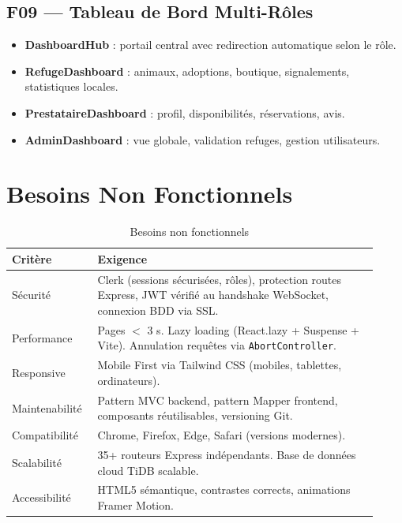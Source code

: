 \documentclass[12pt,a4paper]{report}
\begin{document}
\subsection{F09 --- Tableau de Bord Multi-Rôles}
\begin{itemize}[leftmargin=2em,itemsep=2pt]
  \item \textbf{DashboardHub} : portail central avec redirection automatique selon le rôle.
  \item \textbf{RefugeDashboard} : animaux, adoptions, boutique, signalements, statistiques locales.
  \item \textbf{PrestataireDashboard} : profil, disponibilités, réservations, avis.
  \item \textbf{AdminDashboard} : vue globale, validation refuges, gestion utilisateurs.
\end{itemize}

\section{Besoins Non Fonctionnels}

\begin{table}[H]
\centering
\begin{tabular}{@{}L{0.20\linewidth}L{0.72\linewidth}@{}}
\toprule
\textbf{Critère} & \textbf{Exigence} \\
\midrule
Sécurité & Clerk (sessions sécurisées, rôles), protection routes Express, JWT vérifié au handshake WebSocket, connexion BDD via SSL. \\[4pt]
Performance & Pages $<$ 3 s. Lazy loading (React.lazy + Suspense + Vite). Annulation requêtes via \texttt{AbortController}. \\[4pt]
Responsive & Mobile First via Tailwind CSS (mobiles, tablettes, ordinateurs). \\[4pt]
Maintenabilité & Pattern MVC backend, pattern Mapper frontend, composants réutilisables, versioning Git. \\[4pt]
Compatibilité & Chrome, Firefox, Edge, Safari (versions modernes). \\[4pt]
Scalabilité & 35+ routeurs Express indépendants. Base de données cloud TiDB scalable. \\[4pt]
Accessibilité & HTML5 sémantique, contrastes corrects, animations Framer Motion. \\
\bottomrule
\end{tabular}
\caption{Besoins non fonctionnels}
\label{tab:bnf}
\end{table}
\end{document}
